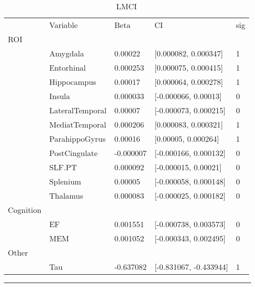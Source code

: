 \documentclass{article}
\begin{document}
\begin{table}[H]
\centering
\caption{LMCI} 
\begin{tabular}{lllll}
   & Variable & Beta & CI & sig \\ 
 ROI &   &   &   &  \\ 
   \rowcolor{green!10}  & Amygdala & 0.00022 & [0.000082, 0.000347] & 1 \\ 
   \rowcolor{green!10}  & Entorhinal & 0.000253 & [0.000075, 0.000415] & 1 \\ 
   \rowcolor{green!10}  & Hippocampus & 0.00017 & [0.000064, 0.000278] & 1 \\ 
    & Insula & 0.000033 & [-0.000066, 0.00013] & 0 \\ 
    & LateralTemporal & 0.00007 & [-0.000073, 0.000215] & 0 \\ 
   \rowcolor{green!10}  & MediatTemporal & 0.000206 & [0.000083, 0.000321] & 1 \\ 
   \rowcolor{green!10}  & ParahippoGyrus & 0.00016 & [0.00005, 0.000264] & 1 \\ 
    & PostCingulate & -0.000007 & [-0.000166, 0.000132] & 0 \\ 
    & SLF.PT & 0.000092 & [-0.000015, 0.00021] & 0 \\ 
    & Splenium & 0.00005 & [-0.000058, 0.000148] & 0 \\ 
    & Thalamus & 0.000083 & [-0.000025, 0.000182] & 0 \\ 
   \midrule
Cognition &   &   &   &  \\ 
    & EF & 0.001551 & [-0.000738, 0.003573] & 0 \\ 
    & MEM & 0.001052 & [-0.000343, 0.002495] & 0 \\ 
   \midrule
Other &   &   &   &  \\ 
   \rowcolor{green!10}  & Tau & -0.637082 & [-0.831067, -0.433944] & 1 \\ 
  \end{tabular}
\end{table}
\noindent\rule[0.5ex]{\linewidth}{1pt}
\end{document}
